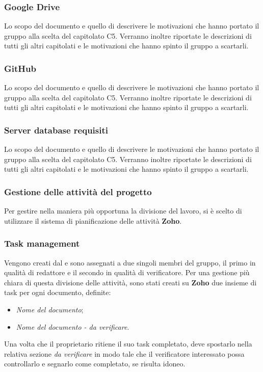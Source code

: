 \subsubsection{Google Drive}
Lo scopo del documento e quello di descrivere le motivazioni che hanno portato il gruppo alla scelta del capitolato C5.
Verranno inoltre riportate le descrizioni di tutti gli altri capitolati e le motivazioni che hanno spinto il gruppo a scartarli.

\subsubsection{GitHub}
Lo scopo del documento e quello di descrivere le motivazioni che hanno portato il gruppo alla scelta del capitolato C5.
Verranno inoltre riportate le descrizioni di tutti gli altri capitolati e le motivazioni che hanno spinto il gruppo a scartarli.

\subsubsection{Server database requisiti}
Lo scopo del documento e quello di descrivere le motivazioni che hanno portato il gruppo alla scelta del capitolato C5.
Verranno inoltre riportate le descrizioni di tutti gli altri capitolati e le motivazioni che hanno spinto il gruppo a scartarli.

\subsubsection{Gestione delle attività del progetto}
Per gestire nella maniera più opportuna la divisione del lavoro, si è scelto di 
utilizzare il sistema di pianificazione delle attività \textbf{Zoho}.

\subsubsection{Task management}
Vengono creati dal \textsl{\RdP} e sono assegnati a due singoli membri del gruppo, 
il primo in qualità di redattore e il secondo in qualità di verificatore.
Per una gestione più chiara di questa divisione delle attività, sono stati creati su \textbf{Zoho} 
due insieme di task per ogni documento, definite:
\begin{itemize}
  \item \textsl{Nome del documento};
  \item \textsl{Nome del documento - da verificare}.
\end{itemize}
Una volta che il proprietario ritiene il suo task completato, deve spostarlo 
nella relativa sezione \textsl{da verificare} in modo tale che il verificatore 
interessato possa controllarlo e segnarlo come completato, se risulta idoneo. 

